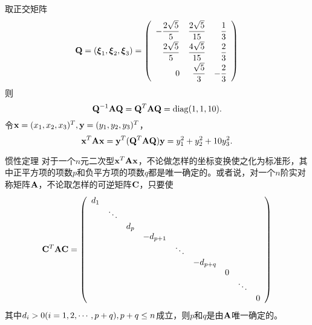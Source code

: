 \begin{frame}
  \begin{footnotesize}
    取正交矩阵
    $$
    \mathbf{Q}=(\boldsymbol{\xi}_1,\boldsymbol{\xi}_2,\boldsymbol{\xi}_3)=\left(
    \begin{array}{rrr}
      \displaystyle-\frac{2\sqrt{5}}5&\displaystyle\frac{2\sqrt{5}}{15}&\displaystyle\frac13\\[0.2cm]
      \displaystyle \frac{2\sqrt{5}}5&\displaystyle\frac{4\sqrt{5}}{15}&\displaystyle\frac23\\[0.2cm]
      \displaystyle 0&\displaystyle\frac{\sqrt{5}}3&\displaystyle-\frac23
    \end{array}
    \right)
    $$
    则
    $$
    \mathbf{Q}^{-1}\mathbf{A}\mathbf{Q}=\mathbf{Q}^{T}\mathbf{A}\mathbf{Q}=\mathrm{diag}(1,1,10).
    $$ \pause 
    令$\mathbf{x}=(x_1,x_2,x_3)^T,\mathbf{y}=(y_1,y_2,y_3)^T$，
    $$
    \mathbf{x}^T\mathbf{A}\mathbf{x}=\mathbf{y}^T(\mathbf{Q}^T\mathbf{A}\mathbf{Q})\mathbf{y}=y_1^2+y_2^2+10y_3^2.
    $$
  \end{footnotesize}
\end{frame}



 




\begin{frame}
  \begin{footnotesize}
    \begin{block}{惯性定理}
      对于一个$n$元二次型$\mathbf{x}^T\mathbf{A}\mathbf{x}$，不论做怎样的坐标变换使之化为标准形，其中正平方项的项数$p$和负平方项的项数$q$都是唯一确定的。或者说，对一个$n$阶实对称矩阵$\mathbf{A}$，不论取怎样的可逆矩阵$\mathbf{C}$，只要使
      $$
      \mathbf{C}^T\mathbf{A}\mathbf{C}=\left(
      \begin{array}{cccccccccc}
        d_1&&&&&&&&\\
        &\ddots&&&&&&&\\
        &&d_p&&&&&&\\
        &&&-d_{p+1}&&&&&\\
        &&&&\ddots&&&&\\
        &&&&&-d_{p+q}&&&\\
        &&&&&&0&&\\
        &&&&&&&\ddots&\\
        &&&&&&&&0
      \end{array}
      \right)
      $$
      其中$d_i>0(i=1,2,\cdots,p+q),p+q\le n$成立，则$p$和$q$是由$\mathbf{A}$唯一确定的。
    \end{block}
  \end{footnotesize}
\end{frame}

 

